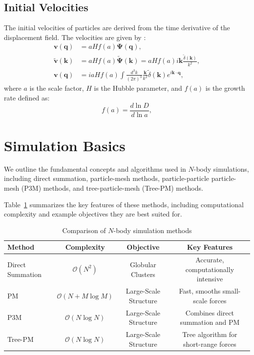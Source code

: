 \subsection{Initial Velocities}
The initial velocities of particles are derived from the time derivative of the displacement field. The velocities are given by \citep{1985ApJS...57..241E}:
\begin{align}
    \mathbf{v}(\mathbf{q}) &= a H f(a) \boldsymbol{\Psi}(\mathbf{q}), \\
    \tilde{\mathbf{v}}(\mathbf{k}) &= a H f(a) \tilde{\boldsymbol{\Psi}}(\mathbf{k}) = a H f(a) i \mathbf{k} \frac{\tilde{\delta}(\mathbf{k})}{k^2}, \\
    \mathbf{v}(\mathbf{q}) &= i a H f(a) \int \frac{d^3k}{(2\pi)^3} \frac{\mathbf{k}}{k^2} \tilde{\delta}(\mathbf{k}) e^{i\mathbf{k} \cdot \mathbf{q}},
\end{align}
where $a$ is the scale factor, $H$ is the Hubble parameter, and $f(a)$ is the growth rate defined as:
\begin{equation}
    f(a) = \frac{d\ln D}{d\ln a},
\end{equation}

\section{Simulation Basics}
We outline the fundamental concepts and algorithms used in $N$-body simulations, including direct summation, particle-mesh methods, particle-particle particle-mesh (P3M) methods, and tree-particle-mesh (Tree-PM) methods.

Table~\ref{tab:simulation-methods} summarizes the key features of these methods, including computational complexity and example objectives they are best suited for.

\begin{table}[ht]
    \centering
    \begin{tabular}{lccc}
        \toprule
        \textbf{Method} & \textbf{Complexity} & \textbf{Objective} & \textbf{Key Features} \\
        \midrule
        Direct Summation & $\mathcal{O}(N^2)$ & Globular Clusters & Accurate, computationally intensive \\
        PM & $\mathcal{O}(N + M \log M)$ & Large-Scale Structure & Fast, smooths small-scale forces \\
        P3M & $\mathcal{O}(N \log N)$ & Large-Scale Structure & Combines direct summation and PM \\
        Tree-PM & $\mathcal{O}(N \log N)$ & Large-Scale Structure & Tree algorithm for short-range forces \\
        \bottomrule
    \end{tabular}
    \caption{Comparison of $N$-body simulation methods}
    \label{tab:simulation-methods}
\end{table}

